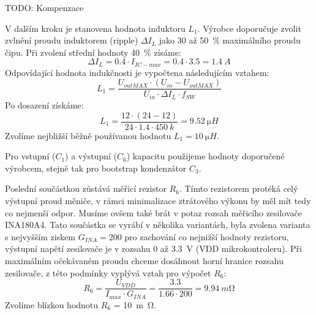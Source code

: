     TODO: Kompenzace

    V dalším kroku je stanovena hodnota induktoru \(L_{1} \). Výrobce doporučuje zvolit zvlnění proudu induktorem (ripple) \(\Delta I_{L}  \) jako 30 až \qty{50}{\percent} maximálního proudu čipu. Při zvolení střední hodnoty \qty{40}{\percent} zísáme:
    \begin{equation}
        \Delta I_{L} = \num{0.4}\cdot I_{IC-max} = \num{0.4} \cdot  \num{3.5} = \qty{1.4}{A}
    \end{equation}
    Odpovídající hodnota indukčnosti je vypočtena následujícím vztahem:
    \begin{equation}
        L_{1} = \frac{U_{outMAX}\cdot (U_{in} -U_{outMAX} ) }{U_{in} \cdot \Delta I_{L}\cdot f_{SW}  }
    \end{equation}
    Po dosazení získáme:
    \begin{equation}
        L_{1} = \frac{12\cdot (24 -12 ) }{24 \cdot \num{1.4}\cdot \qty{450}{k}  } = \qty{9.52}{\micro H}
    \end{equation}
    Zvolíme nejbližší běžně používanou hodnotu \(L_{1} = \qty{10}{\micro H}\).

    Pro vstupní (\(C_{1} \)) a výstupní (\(C_{6} \)) kapacitu použijeme hodnoty doporučené výrobcem, stejně tak pro bootstrap kondenzátor \(C_{3} \). 
    
    Poslední součástkou zůstává měřicí rezistor \(R_{6} \). Tímto rezistorem protéká celý výstupní proud měniče, v rámci minimalizace ztrátového výkonu by měl mít tedy co nejmenší odpor. Musíme ovšem také brát v potaz rozsah měřicího zesilovače INA180A4. Tato součástka se vyrábí v několika variantách, byla zvolena varianta s nejvyšším ziskem \(G_{INA}=200 \) pro zachování co nejnižší hodnoty rezistoru, výstupní napětí zesilovače je v rozsahu 0 až \qty{3.3}{V} (VDD mikrokontroleru).
    Při maximálním očekávaném proudu chceme dosáhnout horní hranice rozsahu zesilovače, z této podmínky vyplývá vztah pro výpočet \(R_{6} \):
    \begin{equation}
        R_{6} = \frac{U_{VDD}}{I_{max} \cdot G_{INA} } = \frac{\num{3.3}}{\num{1.66}\cdot 200} = \qty{9.94}{m\ohm}
    \end{equation} 
    Zvolíme blízkou hodnotu \(R_{6} \) = \qty{10}{m\ohm}.


